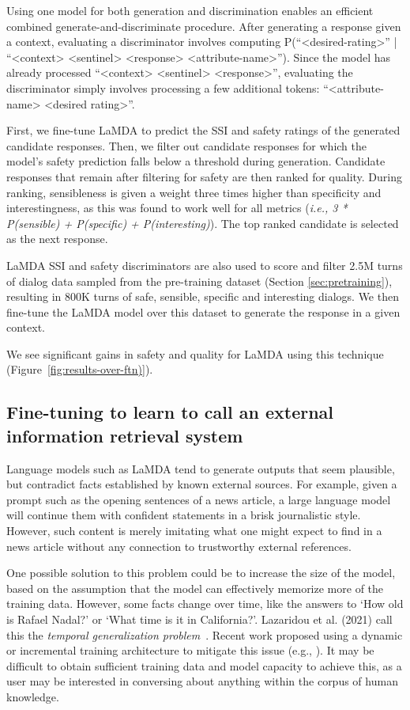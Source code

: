 \documentclass{article}
\def\knowledgetool{information retrieval system\xspace}
\begin{document}
Using one model for both generation and discrimination enables an efficient combined generate-and-discriminate procedure. After generating a response given a context, evaluating a discriminator involves computing P(“<desired-rating>” | “<context> <sentinel> <response> <attribute-name>”). Since the model has already processed “<context> <sentinel> <response>”, evaluating the discriminator simply involves processing a few additional tokens: “<attribute-name> <desired rating>”. 

First, we fine-tune LaMDA to predict the SSI and safety ratings of the generated candidate responses. Then, we filter out candidate responses for which the model’s safety prediction falls below a threshold during generation. Candidate responses that remain after filtering for safety are then ranked for quality.  During ranking, sensibleness is given a weight three times higher than specificity and interestingness, as this was found to work well for all metrics (\textit{i.e., 3 * P(sensible) + P(specific) + P(interesting)}). The top ranked candidate is selected as the next response.

LaMDA SSI and safety discriminators are also used to score and filter 2.5M turns of dialog data sampled from the pre-training dataset (Section \ref{sec:pretraining}), resulting in 800K turns of safe, sensible, specific and interesting dialogs. We then fine-tune the LaMDA model over this dataset to generate the response in a given context.

We see significant gains in safety and quality for LaMDA using this technique (Figure~\ref{fig:results-over-ftn)}).


\subsection{Fine-tuning to learn to call an external \knowledgetool}
\label{sec:factuality}
Language models such as LaMDA tend to generate outputs that seem plausible, but contradict facts established by known external sources. For example, given a prompt such as the opening sentences of a news article, a large language model will continue them with confident statements in a brisk journalistic style. However, such content is merely imitating what one might expect to find in a news article without any connection to trustworthy external references.

One possible solution to this problem could be to increase the size of the model, based on the assumption that the model can effectively memorize more of the training data. However, some facts change over time, like the answers to `How old is Rafael Nadal?' or `What time is it in California?'. Lazaridou et al. (2021) call this the \textit{temporal generalization problem}~\cite{lazaridou2021pitfalls}. Recent work proposed using a dynamic or incremental training architecture to mitigate this issue (e.g., \cite{lazaridou2021pitfalls,hombaiah2021dynamic}). It may be difficult to obtain sufficient training data and model capacity to achieve this, as a user may be interested in conversing about anything within the corpus of human knowledge.
\end{document}
